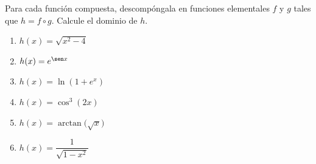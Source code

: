 \begin{prob}
Para cada función compuesta, descompóngala en funciones elementales $f$ y $g$ tales que $h = f\circ g$. Calcule el dominio de $h$.
\par\noindent
\begin{minipage}[t]{0.48\textwidth}
\begin{enumerate}
  \item $h(x) = \sqrt{x^2-4}$
  \item $h(x) = e^{\sen x}$
  \item $h(x) = \ln(1+e^x)$
\end{enumerate}
\end{minipage}\hfill
\begin{minipage}[t]{0.48\textwidth}
\begin{enumerate}
\setcounter{enumi}{3}
  \item $h(x) = \cos^3(2x)$
  \item $h(x) = \arctan\!\bigl(\sqrt{x}\bigr)$
  \item $h(x) = \dfrac{1}{\sqrt{1-x^2}}$
\end{enumerate}
\end{minipage}
\end{prob}

